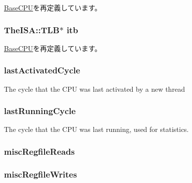 \hyperlink{classBaseCPU_a6d1804c8bb7cb5ff7f700541100052c4}{BaseCPU}を再定義しています。\hypertarget{classFullO3CPU_abcb37ddc11515555d8484702697bc4bb}{
\subsubsection[{itb}]{\setlength{\rightskip}{0pt plus 5cm}TheISA::TLB$\ast$ {\bf itb}}}
\label{classFullO3CPU_abcb37ddc11515555d8484702697bc4bb}


\hyperlink{classBaseCPU_a05093b507c1f741f2150103b12ac7056}{BaseCPU}を再定義しています。\hypertarget{classFullO3CPU_af81ed3d351dcefbd5ca122147676af22}{
\subsubsection[{lastActivatedCycle}]{ {\bf lastActivatedCycle}}}
\label{classFullO3CPU_af81ed3d351dcefbd5ca122147676af22}
The cycle that the CPU was last activated by a new thread \hypertarget{classFullO3CPU_a88989147c1b0b4ccba38fa941722ce5d}{
\subsubsection[{lastRunningCycle}]{ {\bf lastRunningCycle}}}
\label{classFullO3CPU_a88989147c1b0b4ccba38fa941722ce5d}
The cycle that the CPU was last running, used for statistics. \hypertarget{classFullO3CPU_a587b32e057f5caad670d221c166bda5e}{
\subsubsection[{miscRegfileReads}]{ {\bf miscRegfileReads}}}
\label{classFullO3CPU_a587b32e057f5caad670d221c166bda5e}
\hypertarget{classFullO3CPU_a457c81c9e364d41871df8cb5f04ea1b4}{
\subsubsection[{miscRegfileWrites}]{ {\bf miscRegfileWrites}}}
